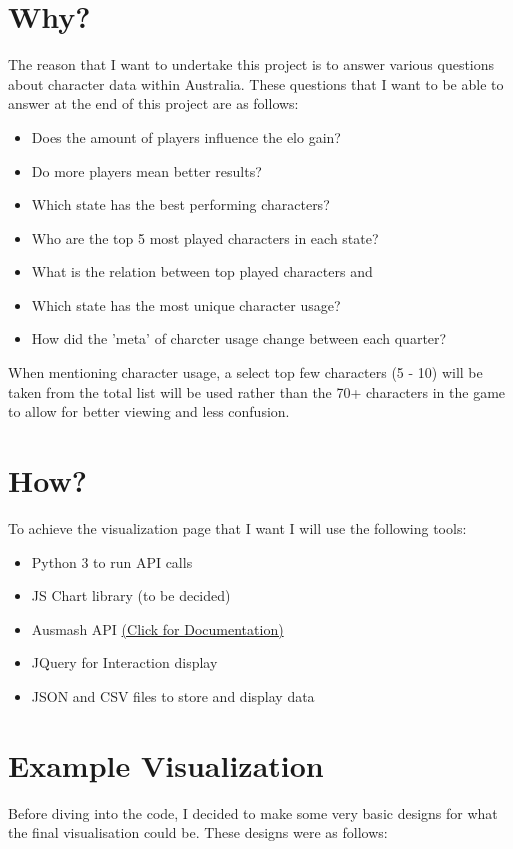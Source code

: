\documentclass[11pt, oneside, a4paper]{article}
\begin{document}
\section*{Why?}
The reason that I want to undertake this project is to answer various questions about character data within Australia. These questions that I want to be able to answer at the end of this project are as follows:
\begin{itemize}
    \item Does the amount of players influence the elo gain?
    \item Do more players mean better results?
    \item Which state has the best performing characters?
    \item Who are the top 5 most played characters in each state?
    \item What is the relation between top played characters and 
    \item Which state has the most unique character usage?
    \item How did the 'meta' of charcter usage change between each quarter?
\end{itemize}
When mentioning character usage, a select top few characters (5 - 10) will be taken from the total list will be used rather than the 70+ characters in the game to allow for better viewing and less confusion.

\section*{How?}
To achieve the visualization page that I want I will use the following tools:
\begin{itemize}
    \item Python 3 to run API calls
    \item JS Chart library (to be decided)
    \item Ausmash API \href{https://api.ausmash.com.au/swagger/ui/index#/}{(Click for Documentation)}
    \item JQuery for Interaction display
    \item JSON and CSV files to store and display data
\end{itemize}

\section*{Example Visualization}
Before diving into the code, I decided to make some very basic designs for what the final visualisation could be. These designs were as follows:

{%
\setlength{\fboxsep}{0pt}%
\setlength{\fboxrule}{1pt}%
%
}%
\end{document}
